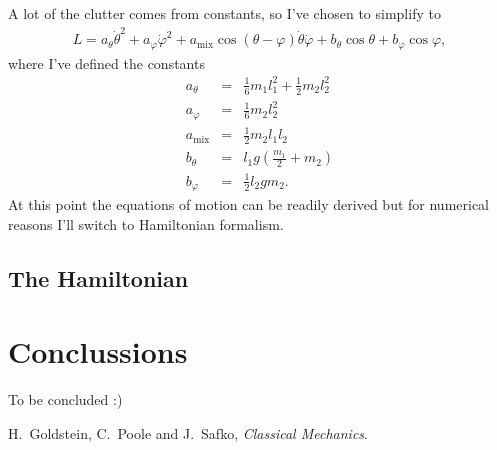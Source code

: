 \documentclass[a4paper]{article}
\begin{document}
	A lot of the clutter comes from constants, so I've chosen to simplify to
	\begin{eqnarray}\label{simplified_Lagrangian}
		L = a_{\theta}\dot{\theta}^2 + a_{\varphi}\dot{\varphi}^2 + a_{\mathrm{mix}}\cos( \theta - \varphi )\dot{\theta}\dot{\varphi} + b_{\theta}\cos{\theta} + b_{\varphi}\cos{\varphi},		
	\end{eqnarray}
	where I've defined the constants
	\begin{eqnarray}\label{a_th_def}
		a_{\theta} &=& \frac{1}{6}m_1 l_1^2 + \frac{1}{2}m_2 l_2^2 \\ \label{a_phi_def}
		a_{\varphi} &=& \frac{1}{6}m_2 l_2^2 \\ \label{a_mix_def}
		a_{\mathrm{mix}} &=& \frac{1}{2}m_2 l_1 l_2 \\ \label{b_th_def}
		b_{\theta} &=& l_1 g \left( \frac{m_1}{2} + m_2 \right) \\ \label{b_phi_def}
		b_{\varphi} &=& \frac{1}{2} l_2 g m_2.
	\end{eqnarray}
	At this point the equations of motion can be readily derived but for numerical reasons I'll switch to Hamiltonian formalism.
	
	\subsection{The Hamiltonian}\label{Hamiltonian_subsection}

	\section{Conclussions}
	To be concluded :)

	\newpage
	\begin{thebibliography}{9}

	H.~Goldstein, C.~Poole and J.~Safko, \textit{Classical Mechanics}.

	\end{thebibliography}
\end{document}

